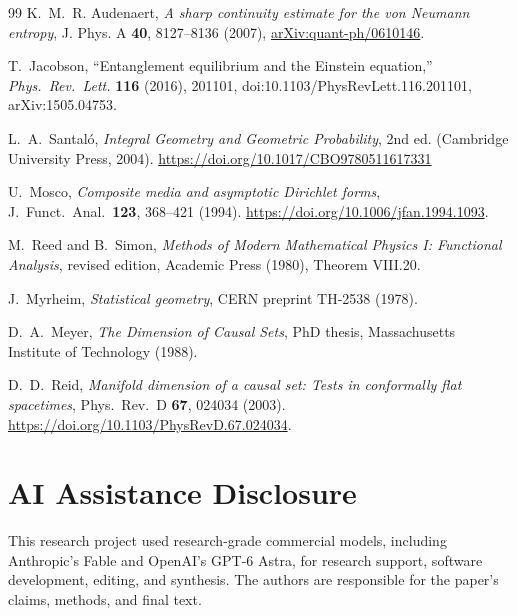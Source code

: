 \documentclass[11pt]{article}
\begin{document}
\begin{thebibliography}{99}
K.~M.~R. Audenaert, \emph{A sharp continuity estimate for the von Neumann
entropy}, J. Phys. A \textbf{40}, 8127--8136 (2007),
\href{https://arxiv.org/abs/quant-ph/0610146}{arXiv:quant-ph/0610146}.

T.~Jacobson,
``Entanglement equilibrium and the Einstein equation,''
\emph{Phys.\ Rev.\ Lett.} \textbf{116} (2016), 201101,
doi:10.1103/PhysRevLett.116.201101,
arXiv:1505.04753.

L.~A.~Santal\'o,
\emph{Integral Geometry and Geometric Probability}, 2nd ed.
(Cambridge University Press, 2004).
\url{https://doi.org/10.1017/CBO9780511617331}

U.~Mosco,
\emph{Composite media and asymptotic Dirichlet forms},
J.\ Funct.\ Anal.\ \textbf{123}, 368--421 (1994).
\url{https://doi.org/10.1006/jfan.1994.1093}.

M.~Reed and B.~Simon,
\emph{Methods of Modern Mathematical Physics I: Functional Analysis},
revised edition, Academic Press (1980), Theorem VIII.20.

J.~Myrheim,
\emph{Statistical geometry},
CERN preprint TH-2538 (1978).

D.~A.~Meyer,
\emph{The Dimension of Causal Sets},
PhD thesis, Massachusetts Institute of Technology (1988).

D.~D.~Reid,
\emph{Manifold dimension of a causal set: Tests in conformally flat spacetimes},
Phys.\ Rev.\ D \textbf{67}, 024034 (2003).
\url{https://doi.org/10.1103/PhysRevD.67.024034}.

\end{thebibliography}

\section*{AI Assistance Disclosure}
This research project used research-grade commercial models, including
Anthropic's Fable and OpenAI's GPT-6 Astra, for research support, software
development, editing, and synthesis. The authors are responsible for the
paper's claims, methods, and final text.
\end{document}
